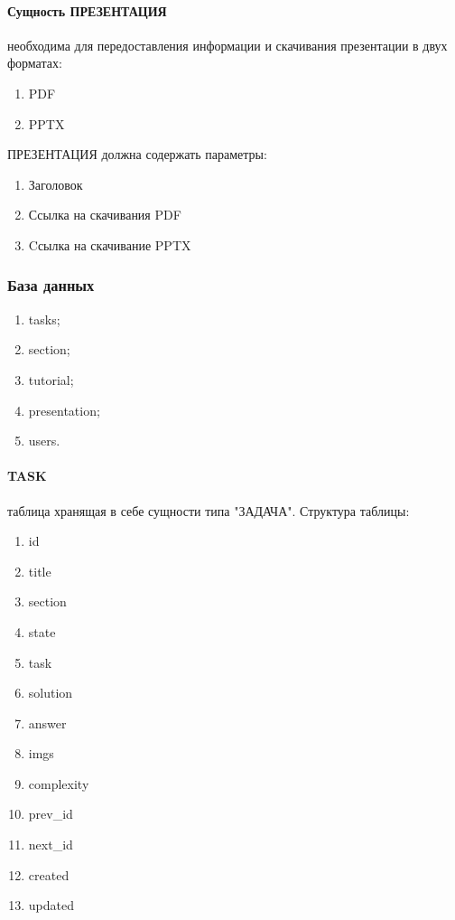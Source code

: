 \paragraph{Сущность ПРЕЗЕНТАЦИЯ} необходима для передоставления информации и скачивания презентации в двух форматах:
\begin{enumerate}
  \item PDF
  \item PPTX
\end{enumerate}
ПРЕЗЕНТАЦИЯ должна содержать параметры:
\begin{enumerate}
  \item Заголовок
  \item Ссылка на скачивания PDF
  \item Cсылка на скачивание PPTX
\end{enumerate}

\subsubsection{База данных}
\begin{enumerate}
  \item tasks;
  \item section;
  \item tutorial;
  \item presentation;
  \item users.
\end{enumerate}

\paragraph{TASK} таблица хранящая в себе сущности типа "ЗАДАЧА". Структура таблицы:
\begin{enumerate}
  \item id
  \item title
  \item section
  \item state
  \item task
  \item solution
  \item answer
  \item imgs
  \item complexity
  \item prev\_id
  \item next\_id
  \item created
  \item updated
\end{enumerate}

